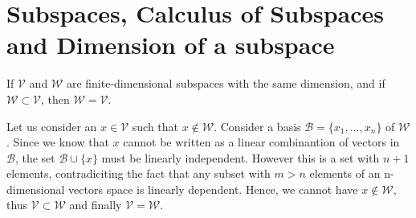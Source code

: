 \section{Subspaces, Calculus of Subspaces and Dimension of a subspace}

\begin{problem}
  If $\mathcal{V}$ and $\mathcal{W}$ are finite-dimensional subspaces with the same dimension, and if $\mathcal{W} \subset \mathcal{V}$, then $\mathcal{W} = \mathcal{V}$.
\end{problem}

\begin{solution}
  Let us consider an $x \in \mathcal{V}$ such that $x \notin \mathcal{W}$.
  Consider a basis $\mathcal{B} = \{x_1, \ldots, x_n\}$ of $\mathcal{W}$.
  Since we know that $x$ cannot be written as a linear combinantion of vectors in $\mathcal{B}$, the set $\mathcal{B} \cup \{x\}$ must be linearly independent.
  However this is a set with $n + 1$ elements, contradiciting the fact that any subset with $m > n$ elements of an n-dimensional vectors space is linearly dependent.
  Hence, we cannot have $x \notin \mathcal{W}$, thus $\mathcal{V} \subset \mathcal{W}$ and finally $\mathcal{V} = \mathcal{W}$.
\end{solution}


